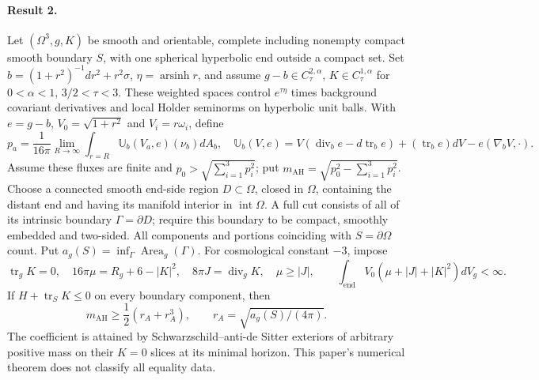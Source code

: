 \documentclass[11pt]{article}
\begin{document}
\paragraph{Result 2.} Let $(\Omega^3,g,K)$ be smooth and orientable, complete including nonempty compact smooth boundary $S$, with one spherical hyperbolic end outside a compact set. Set $b=(1+r^2)^{-1}dr^2+r^2\sigma$, $\eta=\operatorname{arsinh}r$, and assume $g-b\in C^{2,\alpha}_\tau$, $K\in C^{1,\alpha}_\tau$ for $0<\alpha<1$, $3/2<\tau<3$. These weighted spaces control $e^{\tau\eta}$ times background covariant derivatives and local Holder seminorms on hyperbolic unit balls. With $e=g-b$, $V_0=\sqrt{1+r^2}$ and $V_i=r\omega_i$, define
\[
 p_a=\frac1{16\pi}\lim_{R\to\infty}\int_{r=R}\mathbb U_b(V_a,e)(\nu_b)dA_b,\quad
 \mathbb U_b(V,e)=V(\operatorname{div}_be-d\operatorname{tr}_be)
 +(\operatorname{tr}_be)dV-e(\nabla_bV,\cdot).
\]
Assume these fluxes are finite and $p_0>\sqrt{\sum_{i=1}^3p_i^2}$; put $m_{\mathrm{AH}}=\sqrt{p_0^2-\sum_{i=1}^3p_i^2}$. Choose a connected smooth end-side region $D\subset\Omega$, closed in $\Omega$, containing the distant end and having its manifold interior in $\operatorname{int}\Omega$. A full cut consists of all of its intrinsic boundary $\Gamma=\partial D$; require this boundary to be compact, smoothly embedded and two-sided. All components and portions coinciding with $S=\partial\Omega$ count. Put $a_g(S)=\inf_\Gamma\operatorname{Area}_g(\Gamma)$. For cosmological constant $-3$, impose
\[
 \operatorname{tr}_gK=0,\quad16\pi\mu=R_g+6-|K|^2,\quad8\pi J=\operatorname{div}_gK,\quad\mu\ge|J|,
 \qquad \int_{\mathrm{end}}V_0(\mu+|J|+|K|^2)dV_g<\infty.
\]
If $H+\operatorname{tr}_SK\le0$ on every boundary component, then
\[
 m_{\mathrm{AH}}\ge\frac12(r_A+r_A^3),\qquad r_A=\sqrt{a_g(S)/(4\pi)}.
\]
The coefficient is attained by Schwarzschild--anti-de Sitter exteriors of arbitrary positive mass on their $K=0$ slices at its minimal horizon. This paper's numerical theorem does not classify all equality data.
\end{document}
